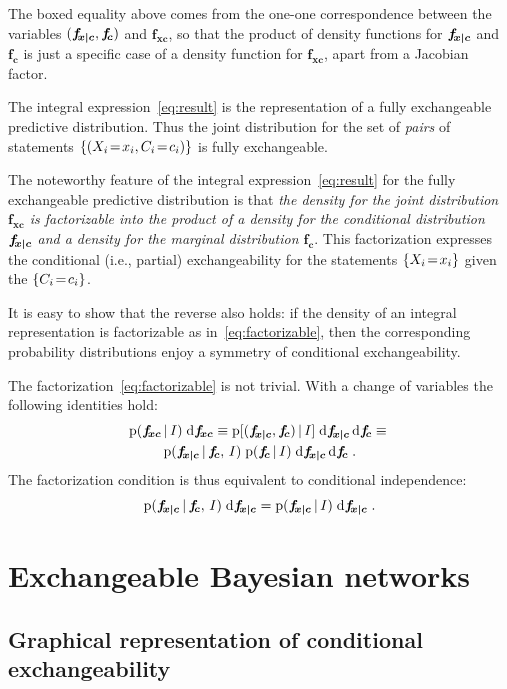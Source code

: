 \documentclass[\ifafour a4paper,12pt,\else a5paper,10pt,\fi%
onecolumn,oneside,article,%
british%
]{memoir}
\theoremstyle{remark}
\theoremstyle{innote}
\newcommand*{\di}{\mathrm{d}}%
\DeclarePairedDelimiter\set{\{}{\}}
\newcommand*{\pf}{\mathrm{p}}%
\renewcommand*{\|}[1][]{\nonscript\,#1\vert\nonscript\,\mathopen{}}
\newcommand*{\ie}{{i.e.}}
\renewcommand*{\=}{\TextOrMath\texteq\eq}
\newcommand*{\X}[1]{X_{#1}}
\newcommand*{\x}[1]{x_{#1}}
\newcommand*{\C}[1]{C_{#1}}
\newcommand*{\cc}[1]{c_{#1}}
\newcommand*{\fxc}{\bm{f_{\!x\bcond c}}}
\newcommand*{\fc}{\bm{f_{\!c}}}
\newcommand*{\fj}{\bm{f_{\!xc}}}
\newcommand*{\bcond}[1][]{\nonscript\,#1\bm{\vert}\nonscript\;\mathopen{}}
\begin{document}
The boxed equality above comes from the one-one correspondence between the
variables $(\fxc,\fc)$ and $\fj$, so that the product of density functions
for $\fxc$ and $\fc$ is just a specific case of a density function for
$\fj$, apart from a Jacobian factor.



The integral expression~\eqref{eq:result} is the representation of a fully
exchangeable predictive distribution. Thus the joint distribution for the
set of \emph{pairs} of statements $\set{(\X{i}\=\x{i}, \C{i}\=\cc{i})}$ is
fully exchangeable.

The noteworthy feature of the integral expression~\eqref{eq:result} for the
fully exchangeable predictive distribution is that \emph{the density for
  the joint distribution $\fj$ is factorizable into the product of a
  density for the conditional distribution $\fxc$ and a density for the
  marginal distribution $\fc$}. This factorization expresses the
conditional (\ie, partial) exchangeability for the statements
$\set{\X{i}\=\x{i}}$ given the $\set{\C{i}\=\cc{i}}$.

It is easy to show that the reverse also holds: if the density of an
integral representation is factorizable as in~\eqref{eq:factorizable}, then
the corresponding probability distributions enjoy a symmetry of conditional
exchangeability.

The factorization~\eqref{eq:factorizable} is not trivial. With a change of
variables the following identities hold:
\begin{multline}
  \label{eq:identities_factor}
  \pf(\fj\|I)\;\di\fj \equiv
  \pf[(\fxc,\fc) \| I] \;\di\fxc\,\di\fc
  \equiv{}\\
  \pf(\fxc \| \fc,\, I)  \;
  \pf(\fc \| I) \;\di\fxc\,\di\fc \;.
\end{multline}
The factorization condition is thus equivalent to conditional independence:
\begin{equation}
  \label{eq:cond_indep_ff}
  \pf(\fxc \| \fc,\, I) \;\di\fxc =
\pf(\fxc \| I) \;\di\fxc \;.
\end{equation}


\section{Exchangeable Bayesian networks}
\label{sec:exch_nets}

\subsection{Graphical representation of conditional exchangeability}
\label{sec:graph_repr}
\end{document}
